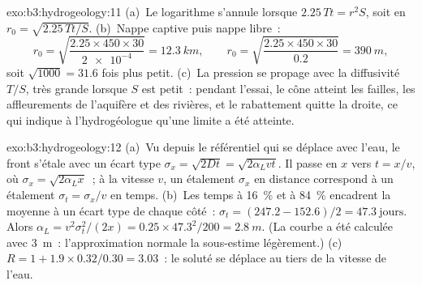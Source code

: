 \begin{solution}{exo:b3:hydrogeology:11}
(a)~Le logarithme s'annule lorsque $2.25\,Tt = r^2S$, soit en $r_0 =
\sqrt{2.25\,Tt/S}$. (b)~Nappe captive puis nappe libre~:
\[
r_0 = \sqrt{\frac{2.25\times450\times30}{\num{2e-4}}} = \qty{12.3}{km},
\qquad r_0 = \sqrt{\frac{2.25\times450\times30}{0.2}} = \qty{390}{m},
\]
soit $\sqrt{1000} = 31.6$ fois plus petit. (c)~La pression
se propage avec la diffusivité $T/S$, très grande lorsque $S$ est petit~: pendant
l'essai, le cône atteint les failles, les affleurements de l'aquifère et des rivières,
et le rabattement quitte la droite, ce qui indique à
l'hydrogéologue qu'une limite a été atteinte.
\end{solution}

\begin{solution}{exo:b3:hydrogeology:12}
(a)~Vu depuis le référentiel qui se déplace avec l'eau, le front s'étale avec
un écart type $\sigma_x = \sqrt{2Dt} = \sqrt{2\alpha_Lvt}$. Il passe en
$x$ vers $t = x/v$, où $\sigma_x = \sqrt{2\alpha_Lx}$~; à la vitesse
$v$, un étalement $\sigma_x$ en distance correspond à un étalement $\sigma_t = \sigma_x/v$
en temps. (b)~Les temps à \qty{16}{\percent} et à \qty{84}{\percent} encadrent
la moyenne à un écart type de chaque côté~: $\sigma_t = (247.2 -
152.6)/2 = \num{47.3}~\text{jours}$. Alors $\alpha_L = v^2\sigma_t^2/(2x) =
0.25\times47.3^2/200 = \qty{2.8}{m}$. (La courbe a été calculée avec
\qty{3}{m}~: l'approximation normale la sous-estime légèrement.) (c)~$R =
1 + 1.9\times0.32/0.30 = \num{3.03}$~: le soluté se déplace au tiers de la
vitesse de l'eau.
\end{solution}

